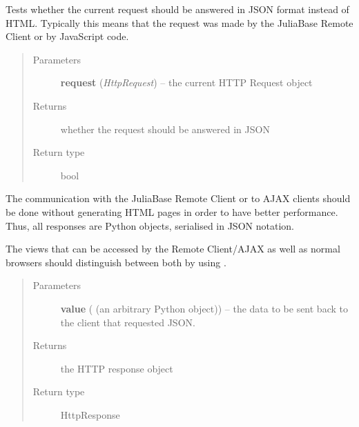 \documentclass[a4paper,11pt,english]{sphinxmanual}
\begin{document}
\begin{fulllineitems}
\label{programming/utilities:jb_common.utils.base.is_json_requested}
Tests whether the current request should be answered in JSON format
instead of HTML.  Typically this means that the request was made by the
JuliaBase Remote Client or by JavaScript code.
\begin{quote}\begin{description}
\item[{Parameters}] \leavevmode
\textbf{request} (\emph{HttpRequest}) -- the current HTTP Request object

\item[{Returns}] \leavevmode
whether the request should be answered in JSON

\item[{Return type}] \leavevmode
bool

\end{description}\end{quote}

\end{fulllineitems}


\begin{fulllineitems}
\label{programming/utilities:jb_common.utils.base.respond_in_json}
The communication with the JuliaBase Remote Client or to AJAX clients
should be done without generating HTML pages in order to have better
performance.  Thus, all responses are Python objects, serialised in JSON
notation.

The views that can be accessed by the Remote Client/AJAX as well as normal
browsers should distinguish between both by using .
\begin{quote}\begin{description}
\item[{Parameters}] \leavevmode
\textbf{value} ( (an arbitrary Python object)) -- the data to be sent back to the client that requested JSON.

\item[{Returns}] \leavevmode
the HTTP response object

\item[{Return type}] \leavevmode
HttpResponse

\end{description}\end{quote}

\end{fulllineitems}
\end{document}
